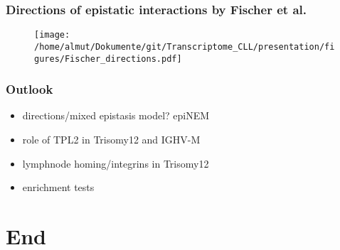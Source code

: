\documentclass[xcolor=dvipsnames,t,10pt]{beamer}
\begin{document}
%
% 
%
\begin{frame}[c]
	\frametitle{Directions of epistatic interactions by Fischer et al.}
	\begin{figure}
		\centering
		\texttt{[image: /home/almut/Dokumente/git/Transcriptome\_CLL/presentation/figures/Fischer\_directions.pdf]}
	\end{figure}
\end{frame}
%
%
\begin{frame}[c]
	\frametitle{Outlook}
	\begin{itemize}
		\item directions/mixed epistasis model? epiNEM
		\item role of TPL2 in Trisomy12 and IGHV-M
		\item lymphnode homing/integrins in Trisomy12
		\item enrichment tests 
	\end{itemize}
\end{frame}

\section{End}
\end{document}
